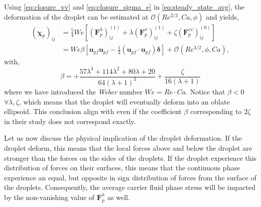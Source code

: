 Using \ref{eq:closure_vv} and \ref{eq:closure_sigma_e} in  \ref{eq:steady_state_avg}, the deformation of the droplet can be estimated at $\mathcal{O}(Re^{2/3},Ca,\phi)$ and yields, 
\begin{align*}
    (\bm\chi_{p})_{ij}
    &= 
    \frac{5}{4}We \left[
        (\textbf{F}_p^h )_{ij}^{(1)}
        + \lambda (\textbf{F}_p^{\sigma})_{ij}^{(1)}
        + \zeta (\textbf{F}_p^{vv})_{ij}^{(0)}
    \right]\\
    &= We \beta [\textbf{u}_{pf}\textbf{u}_{pf} - \frac{1}{3}(\textbf{u}_{pf}\cdot \textbf{u}_{pf})\bm\delta ]
    + \mathcal{O}(Re^{3/2},\phi,Ca),
\end{align*}
with, 
\begin{equation*}
    \beta = 
    + \frac{57 \lambda^{3} + 114 \lambda^{2} + 80 \lambda + 20}{64 \left(\lambda + 1\right)^{3}}
    + \frac{\zeta}{16 \left(\lambda + 1\right)} 
\end{equation*}
where we have introduced the \textit{Weber} number $We = Re \cdot Ca$. 
Notice that $\beta < 0$ $\forall \lambda,\zeta$, which means that the droplet will eventually deform into an oblate ellipsoid.
This conclusion align with \citet{taylor1964deformation} even if the coefficient $\beta$ corresponding to $2\zeta$ in their  study does not correspond exactly.   

Let us now discuss the physical implication of the droplet deformation. 
If the droplet deform, this means that the local forces above and below the droplet are stronger than the forces on the sides of the droplets. 
If the droplet experience this distribution of forces on their surfaces, this means that the continuous phase experience an equal, but opposite in sign distribution of forces from the surface of the droplets. 
Consequently, the average carrier fluid phase stress will be impacted by the non-vanishing value of $\textbf{F}^h_p$ as well. 



